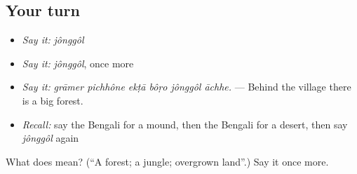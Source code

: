 \subsection*{Your turn}
\begin{itemize}
\raggedright
  \item \emph{Say it:} \emph{jônggôl}
  \item \emph{Say it:} \emph{jônggôl}, once more
  \item \emph{Say it:} \emph{grāmer pichhône ekṭā bôṛo jônggôl āchhe.} — Behind the village there is a big forest.
  \item \emph{Recall:} say the Bengali for a mound, then the Bengali for a desert, then say \emph{jônggôl} again
\end{itemize}

\begin{tcolorbox}[breakable,colback=teal!4,colframe=teal!35!black,title={Before you move on}]
What does  mean? (\textquotedblleft{}A forest; a jungle; overgrown land\textquotedblright{}.) Say it once more.
\end{tcolorbox}
